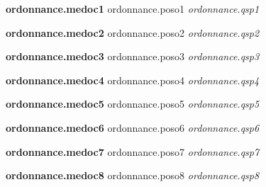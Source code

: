 \documentclass[headlines=6,headinclude=true,10pt]{scrartcl}
\begin{document}
  \begin{itemize}
     {%
    
  \item \textbf{ {{ordonnance.medoc1}} } \hfill {{ ordonnance.poso1 }} \hfill
    \textit{ {{ ordonnance.qsp1 }} } 
    
     {%
 {%
    
  \item \textbf{ {{ordonnance.medoc2}} } \hfill {{ ordonnance.poso2 }} \hfill
    \textit{ {{ ordonnance.qsp2 }} } 
    
    {%

      {%
    
  \item \textbf{ {{ordonnance.medoc3}} } \hfill {{ ordonnance.poso3 }} \hfill
    \textit{ {{ ordonnance.qsp3 }} } 
    
    {%

      {%
    
  \item \textbf{ {{ordonnance.medoc4}} } \hfill {{ ordonnance.poso4 }} \hfill \textit{ {{ ordonnance.qsp4 }} }
    
    {%

      {%
    
  \item \textbf{ {{ordonnance.medoc5}} } \hfill {{ ordonnance.poso5 }} \hfill \textit{ {{ ordonnance.qsp5 }} }
    
    {%

      {%
    
  \item \textbf{  {{ordonnance.medoc6}} } \hfill {{ ordonnance.poso6 }} \hfill \textit{ {{ ordonnance.qsp6 }} }
    
    {%

      {%
    
  \item \textbf{ {{ordonnance.medoc7}} }\hfill {{ ordonnance.poso7 }} \hfill \textit{ {{ ordonnance.qsp7 }} }
    
    {%

      {%
    
  \item \textbf{ {{ordonnance.medoc8}} } \hfill {{ ordonnance.poso8 }} \hfill \textit{ {{ ordonnance.qsp8 }} }
    
}}}}}}}}}}}}}}}
\end{itemize}
\end{document}
